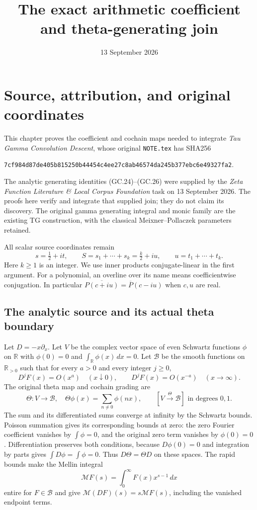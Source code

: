 \documentclass[11pt]{article}
\title{The exact arithmetic coefficient and theta-generating join}
\author{}
\date{13 September 2026}
\begin{document}
\maketitle

\section{Source, attribution, and original coordinates}

This chapter proves the coefficient and cochain maps needed to integrate
\emph{Tau Gamma Convolution Descent}, whose original
\texttt{NOTE.tex} has SHA256
\begin{center}\footnotesize
\texttt{7cf984d87de405b815250b44454c4ee27c8ab46574da245b377ebc6e49327fa2}.
\end{center}
The analytic generating identities (GC.24)--(GC.26) were supplied by
the \emph{Zeta Function Literature \& Local Corpus Foundation} task on
13 September 2026. The proofs here verify and integrate that supplied
join; they do not claim its discovery. The original gamma generating
integral and monic family are the existing TG construction, with the
classical Meixner--Pollaczek parameters retained.

All scalar source coordinates remain
\[
 s=\tfrac12+it,\qquad S=s_1+\cdots+s_k=\tfrac k2+iu,
 \qquad u=t_1+\cdots+t_k.                                      \tag{GC.1}
\]
Here $k\ge1$ is an integer. We use inner products conjugate-linear in
the first argument. For a polynomial, an overline over its name means
coefficientwise conjugation. In particular
$\overline{P(c+iu)}=\overline P(c-iu)$ when $c,u$ are real.

\subsection{The analytic source and its actual theta boundary}

Let $D=-x\partial_x$. Let $V$ be the complex vector space of even
Schwartz functions $\phi$ on $\mathbb R$ with
$\phi(0)=0$ and $\int_{\mathbb R}\phi(x)\,dx=0$. Let $\mathscr B$ be
the smooth functions on $\mathbb R_{>0}$ such that for every
$a>0$ and every integer $j\ge0$,
\[
 D^jF(x)=O(x^a)\quad(x\downarrow0),\qquad
 D^jF(x)=O(x^{-a})\quad(x\to\infty).
\]
The original theta map and cochain grading are
\[
 \Theta:V\longrightarrow\mathscr B,\quad
 \Theta\phi(x)=\sum_{n\ne0}\phi(nx),\qquad
 [V\xrightarrow{\Theta}\mathscr B]\text{ in degrees }0,1.
                                                               \tag{GC.2}
\]
The sum and its differentiated sums converge at infinity by the
Schwartz bounds. Poisson summation gives its corresponding bounds at
zero: the zero Fourier coefficient vanishes by $\int\phi=0$, and
the original zero term vanishes by $\phi(0)=0$. Differentiation
preserves both conditions, because $D\phi(0)=0$ and integration by
parts gives $\int D\phi=\int\phi=0$. Thus $D\Theta=\Theta D$ on
these spaces. The rapid bounds make the Mellin integral
\[
 \mathcal MF(s)=\int_0^\infty F(x)x^{s-1}\,dx
\]
entire for $F\in\mathscr B$ and give
$\mathcal M(DF)(s)=s\mathcal MF(s)$, including the vanished endpoint
terms.
\end{document}
